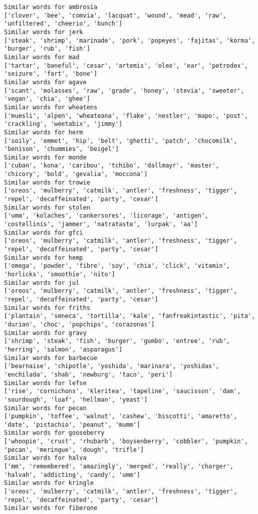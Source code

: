 \documentclass[11pt]{article}
\begin{document}
\begin{Verbatim}[commandchars=\\\{\}]
Similar words for ambrosia
['clover', 'bee', 'comvia', 'lacquat', 'wound', 'mead', 'raw', 'unfiltered', 'cheerio', 'bunch']
Similar words for jerk
['steak', 'shrimp', 'marinade', 'pork', 'popeyes', 'fajitas', 'korma', 'burger', 'rub', 'fish']
Similar words for mad
['tartar', 'baneful', 'cesar', 'artemis', 'oleo', 'ear', 'petrodex', 'seizure', 'fart', 'bone']
Similar words for agave
['scant', 'molasses', 'raw', 'grade', 'honey', 'stevia', 'sweeter', 'vegan', 'chia', 'ghee']
Similar words for wheatens
['muesli', 'alpen', 'wheateana', 'flake', 'nestler', 'mapo', 'post', 'crackling', 'weetabix', 'jimmy']
Similar words for herm
['soily', 'emmet', 'hip', 'belt', 'ghetti', 'patch', 'chocomilk', 'benison', 'chummies', 'beigel']
Similar words for monde
['cuban', 'kona', 'caribou', 'tchibo', 'dallmayr', 'master', 'chicory', 'bold', 'gevalia', 'moccona']
Similar words for trowie
['oreos', 'mulberry', 'catmilk', 'antler', 'freshness', 'tigger', 'repel', 'decaffeinated', 'party', 'cesar']
Similar words for stolen
['umm', 'kolaches', 'cankersores', 'licorage', 'antigen', 'costellinis', 'jammer', 'natrataste', 'lurpak', 'aa']
Similar words for gfci
['oreos', 'mulberry', 'catmilk', 'antler', 'freshness', 'tigger', 'repel', 'decaffeinated', 'party', 'cesar']
Similar words for hemp
['omega', 'powder', 'fibre', 'soy', 'chia', 'click', 'vitamin', 'horlicks', 'smoothie', 'nito']
Similar words for jul
['oreos', 'mulberry', 'catmilk', 'antler', 'freshness', 'tigger', 'repel', 'decaffeinated', 'party', 'cesar']
Similar words for friths
['plantain', 'seneca', 'tortilla', 'kale', 'fanfreakintastic', 'pita', 'durian', 'choc', 'popchips', 'corazonas']
Similar words for gravy
['shrimp', 'steak', 'fish', 'burger', 'gumbo', 'entree', 'rub', 'herring', 'salmon', 'asparagus']
Similar words for barbecue
['bearnaise', 'chipotle', 'yoshida', 'marinara', 'yoshidas', 'enchilada', 'shab', 'newburg', 'taco', 'peri']
Similar words for lefse
['rise', 'cornichons', 'kleritea', 'tapeline', 'saucisson', 'dam', 'sourdough', 'loaf', 'hellman', 'yeast']
Similar words for pecan
['pumpkin', 'toffee', 'walnut', 'cashew', 'biscotti', 'amaretto', 'date', 'pistachio', 'peanut', 'mumm']
Similar words for gooseberry
['whoopie', 'crust', 'rhubarb', 'boysenberry', 'cobbler', 'pumpkin', 'pecan', 'meringue', 'dough', 'trifle']
Similar words for halva
['mm', 'remembered', 'amazingly', 'merged', 'really', 'charger', 'halvah', 'addicting', 'candy', 'umm']
Similar words for kringle
['oreos', 'mulberry', 'catmilk', 'antler', 'freshness', 'tigger', 'repel', 'decaffeinated', 'party', 'cesar']
Similar words for fiberone

\end{Verbatim}
\end{document}
